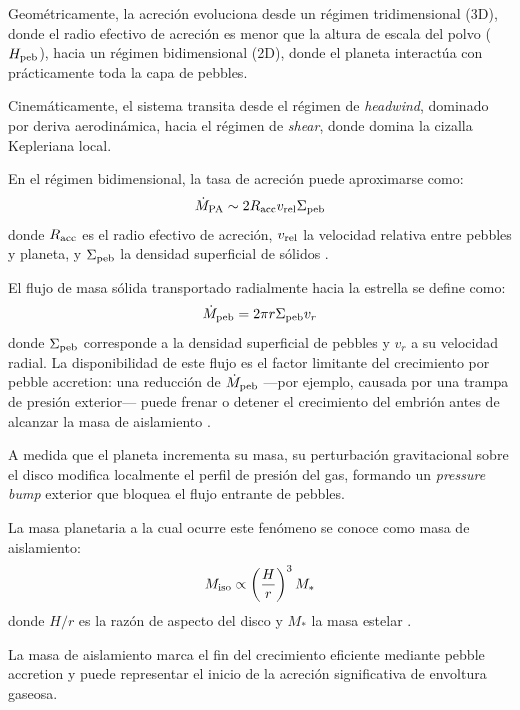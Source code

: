 Geométricamente, la acreción evoluciona desde un régimen tridimensional (3D), donde el radio efectivo de acreción es menor que la altura de escala del polvo ($H_{\rm peb}$), hacia un régimen bidimensional (2D), donde el planeta interactúa con prácticamente toda la capa de pebbles.

Cinemáticamente, el sistema transita desde el régimen de \textit{headwind}, dominado por deriva aerodinámica, hacia el régimen de \textit{shear}, donde domina la cizalla Kepleriana local.

En el régimen bidimensional, la tasa de acreción puede aproximarse como:
\begin{equation}
\dot{M}_{\rm PA} \sim 2 R_{\rm acc} v_{\rm rel} \Sigma_{\rm peb}
\end{equation}
donde $R_{\rm acc}$ es el radio efectivo de acreción, $v_{\rm rel}$ la velocidad relativa entre pebbles y planeta, y $\Sigma_{\rm peb}$ la densidad superficial de sólidos \citep{Lambrechts2014}.


El flujo de masa sólida transportado radialmente hacia la estrella se define como:
\begin{equation}
\dot{M}_{\rm peb} = 2\pi r \Sigma_{\rm peb} v_r
\end{equation}
donde $\Sigma_{\rm peb}$ corresponde a la densidad superficial de pebbles y $v_r$ a su velocidad radial. La disponibilidad de este flujo es el factor limitante del crecimiento por pebble accretion: una reducción de $\dot{M}_{\rm peb}$ ---por ejemplo, causada por una trampa de presión exterior--- puede frenar o detener el crecimiento del embrión antes de alcanzar la masa de aislamiento \citep{Lambrechts2014}.


A medida que el planeta incrementa su masa, su perturbación gravitacional sobre el disco modifica localmente el perfil de presión del gas, formando un \textit{pressure bump} exterior que bloquea el flujo entrante de pebbles.

La masa planetaria a la cual ocurre este fenómeno se conoce como masa de aislamiento:
\begin{equation}
    M_{\rm iso} \propto \left(\frac{H}{r}\right)^3 M_*
\end{equation}
donde $H/r$ es la razón de aspecto del disco y $M_*$ la masa estelar \citep{Lambrechts2014, Ormel2017, Ataiee2018, Bitsch2015}.

La masa de aislamiento marca el fin del crecimiento eficiente mediante pebble accretion y puede representar el inicio de la acreción significativa de envoltura gaseosa.

